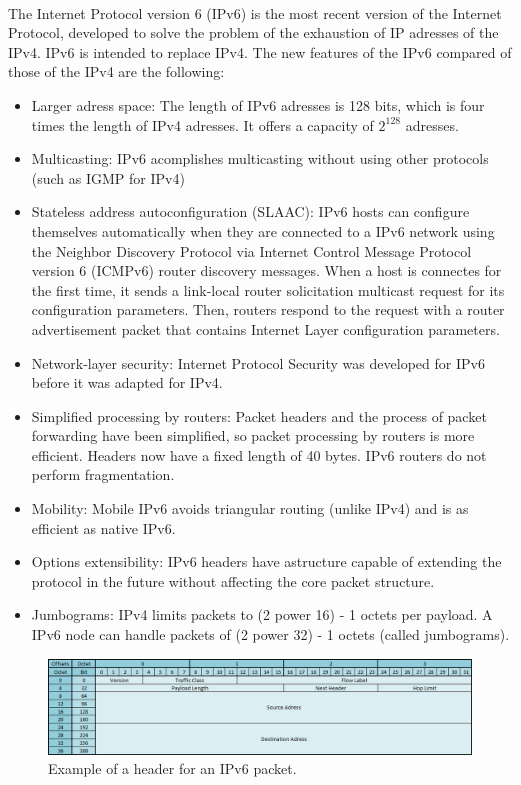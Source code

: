 \documentclass[12pt,a4paper]{report}
\begin{document}
\paragraph{}The Internet Protocol version 6 (IPv6) is the most recent version of the Internet Protocol, developed to solve the problem of the exhaustion of IP adresses of the IPv4. IPv6 is intended to replace IPv4. The new features of the IPv6 compared of those of the IPv4 are the following:
\begin{itemize}
	\item Larger adress space: The length of IPv6 adresses is 128 bits, which is four times the length of IPv4 adresses. It offers a capacity of $2^{128}$ adresses.
	\item Multicasting: IPv6 acomplishes multicasting without using other protocols (such as IGMP for IPv4)
	\item Stateless address autoconfiguration (SLAAC): IPv6 hosts can configure themselves automatically when they are connected to a IPv6 network using the Neighbor Discovery Protocol via Internet Control Message Protocol version 6 (ICMPv6) router discovery messages. When a host is connectes for the first time, it sends a link-local router solicitation multicast request for its configuration parameters. Then, routers respond to the request with a router advertisement packet that contains Internet Layer configuration parameters.
	\item Network-layer security: Internet Protocol Security was developed for IPv6 before it was adapted for IPv4.
	\item Simplified processing by routers: Packet headers and the process of packet forwarding have been simplified, so packet processing by routers is more efficient. Headers now have a fixed length of 40 bytes. IPv6 routers do not perform fragmentation.
	\item Mobility: Mobile IPv6 avoids triangular routing (unlike IPv4) and is as efficient as native IPv6.
	\item Options extensibility: IPv6 headers have astructure capable of extending the protocol in the future without affecting the core packet structure.
	\item Jumbograms: IPv4 limits packets to (2 power 16) - 1 octets per payload. A IPv6 node can handle packets of (2 power 32) - 1 octets (called jumbograms).
\end{itemize}
\begin{figure}[H]
\begin{center}
\includegraphics[scale=0.6]{IPv6_header.PNG}
\caption[IPv6 header]{Example of a header for an IPv6 packet.}
\end{center}
\end{figure}
\end{document}
